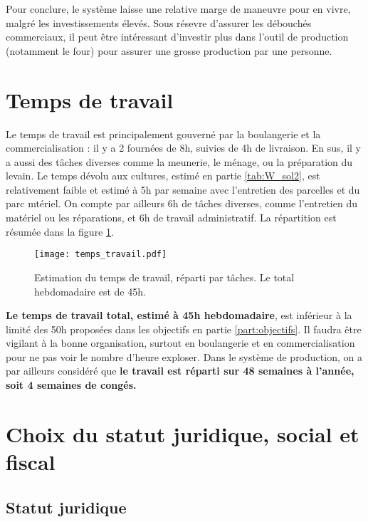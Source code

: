 \documentclass{book}
\begin{document}
Pour conclure, le système laisse une relative marge de maneuvre pour en vivre, malgré les investissements élevés. Sous résevre d'assurer les débouchés commerciaux, il peut être intéressant d'investir plus dans l'outil de production (notamment le four) pour assurer une grosse production par une personne.  

\section{Temps de travail}
\label{part:tps_travail}

Le temps de travail est principalement gouverné par la boulangerie et la commercialisation : il y a 2 fournées de 8h, suivies de 4h de livraison. En sus, il y a aussi des tâches diverses comme la meunerie, le ménage, ou la préparation du levain. Le temps dévolu aux cultures, estimé en partie \ref{tab:W_sol2}, est relativement faible et estimé à 5h par semaine avec l'entretien des parcelles et du parc mtériel. On compte par ailleurs 6h de tâches diverses, comme l'entretien du matériel ou les réparations, et 6h de travail administratif. La répartition est résumée dans la figure \ref{fig:tps_travail}.

\begin{figure}[h!]
\begin{center}
	\texttt{[image: temps\_travail.pdf]}
	\caption{Estimation du temps de travail, réparti par tâches. Le total hebdomadaire est de 45h.}
	\label{fig:tps_travail}
\end{center}
\end{figure}

\textbf{Le temps de travail total, estimé à 45h hebdomadaire}, est inférieur à la limité des 50h proposées dans les objectifs en partie \ref{part:objectifs}. Il faudra être vigilant à la bonne organisation, surtout en boulangerie et en commercialisation pour ne pas voir le nombre d'heure exploser. Dans le système de production, on a par ailleurs considéré que \textbf{le travail est réparti sur 48 semaines à l'année, soit 4 semaines de congés.}

\section{Choix du statut juridique, social et fiscal}

\subsection{Statut juridique}
\end{document}
